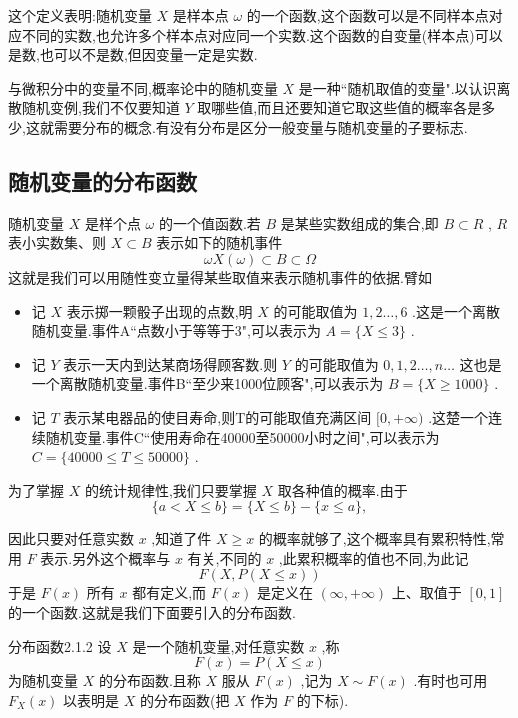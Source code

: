 这个定义表明:随机变量 $ X $ 是样本点 $ \omega $ 的一个函数,这个函数可以是不同样本点对应不同的实数,也允许多个样本点对应同一个实数.这个函数的自变量(样本点)可以是数,也可以不是数,但因变量一定是实数.

与微积分中的变量不同,概率论中的随机变量 $ X $ 是一种``随机取值的变量".以认识离散随机变例,我们不仅要知道 $ Y $ 取哪些值,而且还要知道它取这些值的概率各是多少,这就需要分布的概念.有没有分布是区分一般变量与随机变量的子要标志.

\subsection{随机变量的分布函数}\label{ssec:2.1.2}

随机变量 $ X $ 是样个点 $ \omega $ 的一个值函数.若 $ B $ 是某些实数组成的集合,即 $ B\subset R $ , $ R $ 表小实数集、则 $ X\subset B $ 表示如下的随机事件
\[
\omega X(\omega)\subset B \subset \Omega
\]
这就是我们可以用随性变立量得某些取值来表示随机事件的依据.臂如

\begin{itemize}
	\item 记 $ X $ 表示掷一颗骰子出现的点数,明 $ X $ 的可能取值为 $ 1,2\dotsc ,6 $ .这是一个离散随机变量.事件A``点数小于等等于3",可以表示为 $ A=\{X\leq 3\} $ .
	\item 记 $ Y $ 表示一天内到达某商场得顾客数.则 $ Y $ 的可能取值为 $ 0,1,2\dotsc ,n\dotsc $ 这也是一个离散随机变量.事件B``至少来1000位顾客",可以表示为 $ B=\{ X\geq 1000 \} $ .
	\item 记 $ T $ 表示某电器品的使目寿命,则T的可能取值充满区间 $ [0,+\infty ) $ .这楚一个连续随机变量.事件C``使用寿命在40000至50000小时之间",可以表示为 $ C=\{ 40000 \leq T \leq 50000 \} $ . 
\end{itemize}

为了掌握 $ X $ 的统计规律性,我们只要掌握 $ X $ 取各种值的概率.由于
\[
\{a < X \leq b \} = \{ X \leq b\} - \{x\leq a\},
\]

因此只要对任意实数 $ x $ ,知道了件 $ X\geq x $ 的概率就够了,这个概率具有累积特性,常用 $ F $ 表示.另外这个概率与 $ x $ 有关,不同的 $ x $ ,此累积概率的值也不同,为此记
\[
F(X,P(X\leq x))
\]
于是 $ F(x) $ 所有 $ x $ 都有定义,而 $ F(x) $ 是定义在 $ (\infty,+\infty ) $ 上、取值于 $ [0,1] $ 的一个函数.这就是我们下面要引入的分布函数.

\begin{definition}{分布函数}{2.1.2}
	设 $ X $ 是一个随机变量,对任意实数 $ x $ ,称
	\begin{equation} 
	F(x)=P(X \leqslant x) \label{2.1.1}
	\end{equation}
	为随机变量 $ X $ 的分布函数.且称 $ X $ 服从 $ F(x) $ ,记为 $ X\sim F(x) $ .有时也可用 $ F_{X}(x) $ 以表明是 $ X $ 的分布函数(把 $ X $ 作为 $ F $ 的下标).
\end{definition}


